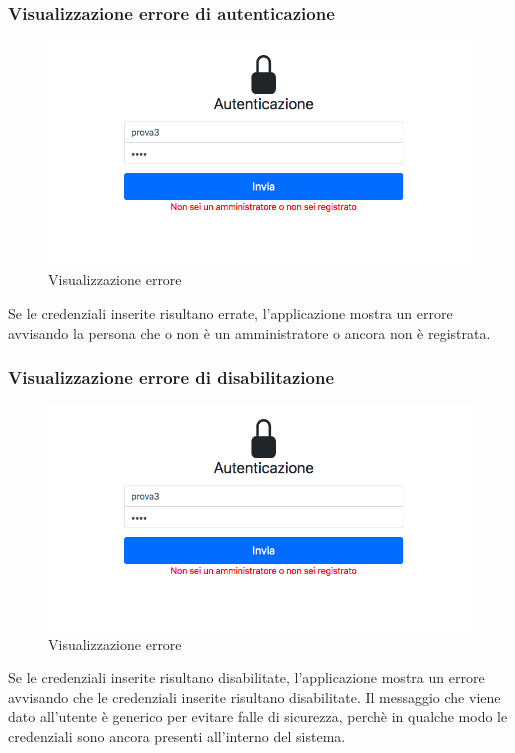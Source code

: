 \subsubsection{Visualizzazione errore di autenticazione}
\begin{figure}[H]
	\centering
	\includegraphics[width=15cm]{res/images/error.png}
	\caption{Visualizzazione errore}
\end{figure}
Se le credenziali inserite risultano errate, l’applicazione mostra un errore avvisando la persona che o non è un amministratore o ancora non è registrata.

\subsubsection{Visualizzazione errore di disabilitazione}
\begin{figure}[H]
	\centering
	\includegraphics[width=15cm]{res/images/error.png}
	\caption{Visualizzazione errore}
\end{figure}
Se le credenziali inserite risultano disabilitate, l’applicazione mostra un errore avvisando che le credenziali inserite risultano disabilitate.
Il messaggio che viene dato all'utente è generico per evitare falle di sicurezza, perchè in qualche modo le credenziali sono ancora presenti all'interno del sistema.
